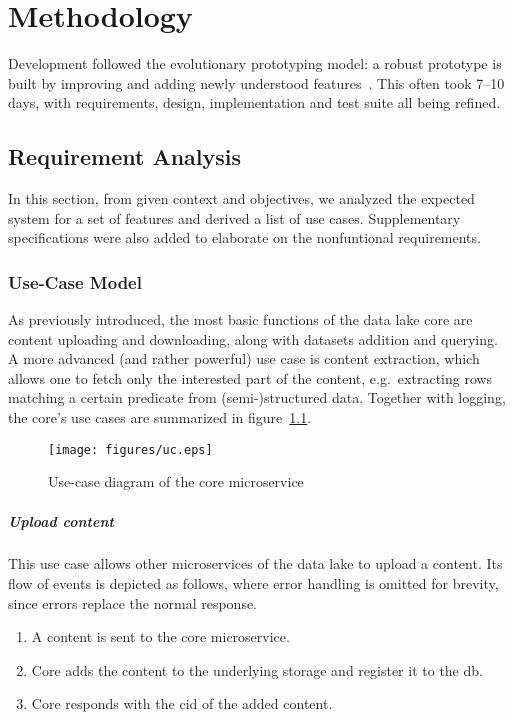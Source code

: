 \chapter{Methodology}
Development followed the evolutionary prototyping model: a robust prototype
is built by improving and adding newly understood features~\cite{proto}.
This often took 7--10 days, with requirements, design, implementation
and test suite all being refined.

\section{Requirement Analysis}
In this section, from given context and objectives, we analyzed
the expected system for a set of features and derived a list of use cases.
Supplementary specifications were also added to elaborate
on the nonfuntional requirements.

\subsection{Use-Case Model}\label{uc-model}
As previously introduced, the most basic functions of the data lake core
are \gls{content} uploading and downloading, along with datasets addition
and querying.  A more advanced (and rather powerful) use case is
content extraction, which allows one to fetch only the interested part
of the content, e.g.~extracting rows matching a certain \gls{predicate}
from (semi-)structured data.  Together with logging, the core's use cases
are summarized in figure~\ref{uc}.

\begin{figure}\centering
  \texttt{[image: figures/uc.eps]}
  \caption{Use-case diagram of the core microservice}
  \label{uc}
\end{figure}

\paragraph{Upload content}  This use case allows other microservices
of the data lake to upload a \gls{content}.  Its flow of events is depicted
as follows, where error handling is omitted for brevity, since errors
replace the normal response.
\begin{enumerate}
  \item A \gls{content} is sent to the core microservice.
  \item Core adds the content to the underlying storage
    and register it to the \gls{db}.
  \item Core responds with the \gls{cid} of the added \gls{content}.
\end{enumerate}

